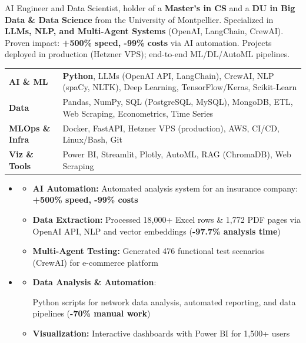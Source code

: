 \documentclass[11pt,a4paper]{article}
\renewcommand{\itemspace}{\vspace{0.25em}}
\begin{document}
\cvheader{\textcolor{black}{\LARGE AI Engineer \& Data Scientist}}

\noindent
AI Engineer and Data Scientist, holder of a \textbf{Master's in CS} and a \textbf{DU in Big Data \& Data Science} from the University of Montpellier. Specialized in \textbf{LLMs, NLP, and Multi-Agent Systems} (OpenAI, LangChain, CrewAI). Proven impact: \textbf{+500\% speed, -99\% costs} via AI automation. Projects deployed in production (Hetzner VPS); end-to-end ML/DL/AutoML pipelines.

\noindent
\begin{tabularx}{\linewidth}{@{} p{3.2cm} X @{}}
\textbf{AI \& ML} & \textbf{Python}, LLMs (OpenAI API, LangChain), CrewAI, NLP (spaCy, NLTK), Deep Learning, TensorFlow/Keras, Scikit-Learn \\
\textbf{Data} & Pandas, NumPy, SQL (PostgreSQL, MySQL), MongoDB, ETL, Web Scraping, Econometrics, Time Series \\
\textbf{MLOps \& Infra} & Docker, FastAPI, Hetzner VPS (production), AWS, CI/CD, Linux/Bash, Git \\
\textbf{Viz \& Tools} & Power BI, Streamlit, Plotly, AutoML, RAG (ChromaDB), Web Scraping \\
\end{tabularx}

\begin{itemize}[leftmargin=1em, label={}]
    \item
    \begin{itemize}[leftmargin=1.5em, label={\textbullet}, nosep]
        \item \textbf{AI Automation:} Automated analysis system for an insurance company: \textbf{+500\% speed, -99\% costs}
        \item \textbf{Data Extraction:} Processed 18,000+ Excel rows \& 1,772 PDF pages via OpenAI API, NLP and vector embeddings (\textbf{-97.7\% analysis time})
        \item \textbf{Multi-Agent Testing:} Generated 476 functional test scenarios (CrewAI) for e-commerce platform
    \end{itemize}

    \itemspace
    \item
    \begin{itemize}[leftmargin=1.5em, label={\textbullet}, nosep]
        \item \textbf{Data Analysis \& Automation}: \raggedright Python scripts for network data analysis, automated reporting, and data pipelines (\textbf{-70\% manual work})
        \item \textbf{Visualization:} Interactive dashboards with Power BI for 1,500+ users
    \end{itemize}
\end{itemize}
\end{document}
